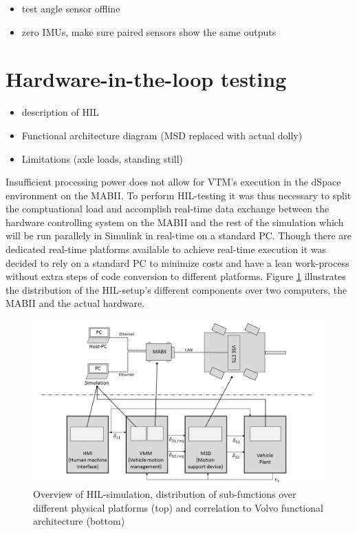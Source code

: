\documentclass[ExampleMasters.tex]{subfiles}
\begin{document}
\begin{itemize}
	\item test angle sensor offline
	\item zero IMUs, make sure paired sensors show the same outputs
	
\end{itemize}

\section{Hardware-in-the-loop testing}
\label{sec:HIL}
\begin{itemize}
	\item description of HIL
	\item Functional architecture diagram (MSD replaced with actual dolly)
	\item Limitations (axle loads, standing still)
\end{itemize}

Insufficient processing power does not allow for VTM's execution in the dSpace environment on the MABII. To perform HIL-testing it was thus necessary to split the comptuational load and accomplish real-time data exchange between the hardware controlling system on the MABII and the rest of the simulation which will be run parallely in Simulink in real-time on a standard PC. Though there are dedicated real-time platforms available to achieve real-time execution it was decided to rely on a standard PC to minimize costs and have a lean work-process without extra steps of code conversion to different platforms. Figure \ref{fig:HIL_overview} illustrates the distribution of the HIL-setup's different components over two computers, the MABII and the actual hardware. 

\begin{figure}[h]
	\centering
	\includegraphics[width=1\linewidth]{figures/HIL_overview}
	\caption{Overview of HIL-simulation, distribution of sub-functions over different physical platforms (top) and correlation to Volvo functional architecture (bottom)}
	
	\label{fig:HIL_overview}
\end{figure}
\end{document}
